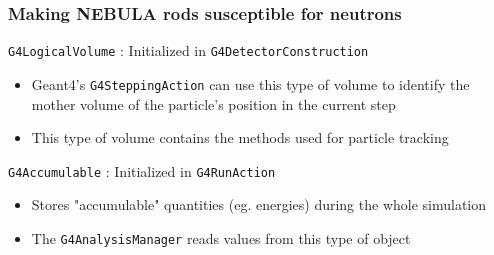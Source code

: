 \begin{frame}
\frametitle{Making NEBULA rods susceptible for neutrons}

\begin{block}{\texttt{G4LogicalVolume} : Initialized in \texttt{G4DetectorConstruction}}
	\begin{itemize}
		\item Geant4's \texttt{G4SteppingAction} can use this type of volume to identify the mother volume of the particle's position in the current step
		\item This type of volume contains the methods used for particle tracking
	\end{itemize}
\end{block}

\begin{alertblock}{\texttt{G4Accumulable} : Initialized in \texttt{G4RunAction}}
	\begin{itemize}
		\item Stores "accumulable" quantities (eg. energies) during the whole simulation
		\item The \texttt{G4AnalysisManager} reads values from this type of object
	\end{itemize}
\end{alertblock}


\end{frame}